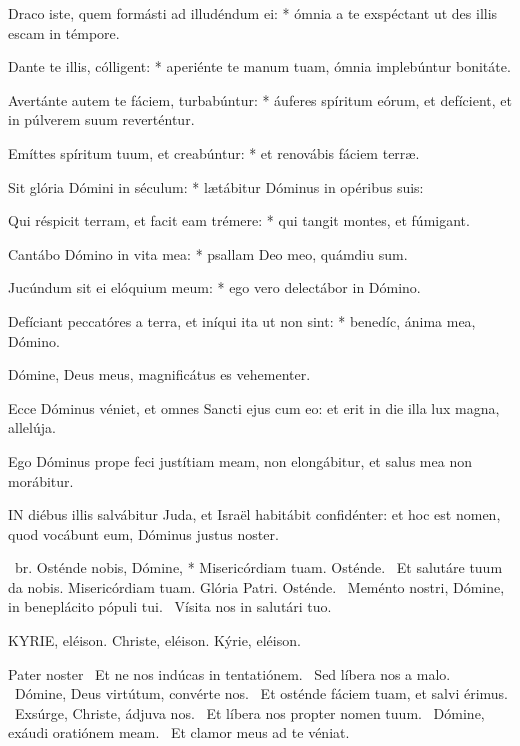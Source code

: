 Draco iste, quem formásti ad illudéndum ei: * ómnia a te exspéctant ut des illis escam in témpore.

Dante te illis, cólligent: * aperiénte te manum tuam, ómnia implebúntur bonitáte.

Avertánte autem te fáciem, turbabúntur: * áuferes spíritum eórum, et defícient, et in púlverem suum reverténtur.

Emíttes spíritum tuum, et creabúntur: * et renovábis fáciem terræ.

Sit glória Dómini in séculum: * lætábitur Dóminus in opéribus suis:

Qui réspicit terram, et facit eam trémere: * qui tangit montes, et fúmigant.

Cantábo Dómino in vita mea: * psallam Deo meo, quámdiu sum.

Jucúndum sit ei elóquium meum: * ego vero delectábor in Dómino.

Defíciant peccatóres a terra, et iníqui ita ut non sint: * benedíc, ánima mea, Dómino.

  Dómine, Deus meus, magnificátus es vehementer.


  Ecce Dóminus véniet, et omnes Sancti ejus cum eo: et erit in die illa lux magna, allelúja.

  Ego Dóminus prope feci justítiam meam, non elongábitur, et salus mea non morábitur.


\lettrine[lines=2]{I}{N} diébus illis salvábitur Juda, et Israël habitábit confidénter: et hoc est nomen, quod vocábunt eum, Dóminus justus noster.

\R\ br. Osténde nobis, Dómine, * Misericórdiam tuam. Osténde. \V\ Et salutáre tuum da nobis. Misericórdiam tuam. Glória Patri. Osténde. \V\ Meménto nostri, Dómine, in beneplácito pópuli tui. \R\ Vísita nos in salutári tuo.


KYRIE, eléison. Christe, eléison. Kýrie, eléison.

Pater noster  \V\ Et ne nos indúcas in tentatiónem. \R\ Sed líbera nos a malo. \V\ Dómine, Deus virtútum, convérte nos. \R\ Et osténde fáciem tuam, et salvi érimus. \V\ Exsúrge, Christe, ádjuva nos. \R\ Et líbera nos propter nomen tuum. \V\ Dómine, exáudi oratiónem meam. \R\ Et clamor meus ad te véniat.

